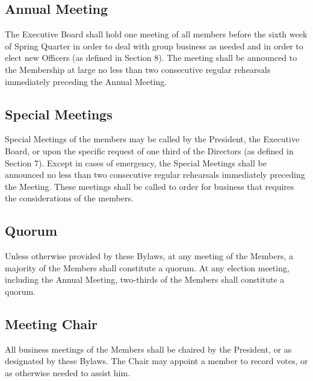 \documentclass{article}
\begin{document}
\subsection{Annual Meeting}

The Executive Board shall hold one meeting of all members before the
sixth week of Spring Quarter in order to deal with group business
as needed and in order to elect new Officers (as defined in Section
8). The meeting shall be announced to the Membership at large no less
than two consecutive regular rehearsals immediately preceding the
Annual Meeting.

\subsection{Special Meetings}

Special Meetings of the members may be called by the President, the
Executive Board, or upon the specific request of one third of the
Directors (as defined in Section 7). Except in cases of emergency, the Special Meetings shall be announced no less
than two consecutive regular rehearsals immediately preceding the
Meeting. These meetings shall be called to order for business that requires the considerations of the members.

\subsection{Quorum}

Unless otherwise provided by these Bylaws, at any meeting of the Members,
a majority of the Members shall constitute a quorum. At any election
meeting, including the Annual Meeting, two-thirds of the Members shall
constitute a quorum.

\subsection{Meeting Chair}

All business meetings of the Members shall be chaired by the President,
or as designated by these Bylaws. The Chair may appoint a member to
record votes, or as otherwise needed to assist him.

\end{document}
